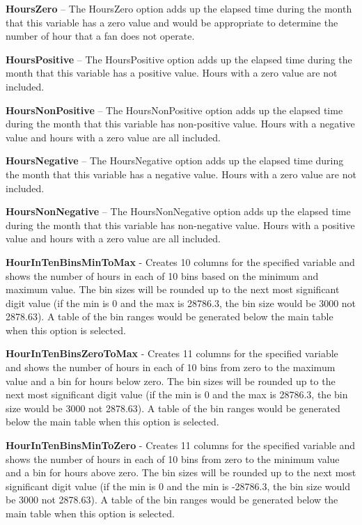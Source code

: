 \textbf{HoursZero} -- The HoursZero option adds up the elapsed time during the month that this variable has a zero value and would be appropriate to determine the number of hour that a fan does not operate.

\textbf{HoursPositive} -- The HoursPositive option adds up the elapsed time during the month that this variable has a positive value. Hours with a zero value are not included.

\textbf{HoursNonPositive} -- The HoursNonPositive option adds up the elapsed time during the month that this variable has non-positive value. Hours with a negative value and hours with a zero value are all included.

\textbf{HoursNegative} -- The HoursNegative option adds up the elapsed time during the month that this variable has a negative value. Hours with a zero value are not included.

\textbf{HoursNonNegative} -- The HoursNonNegative option adds up the elapsed time during the month that this variable has non-negative value. Hours with a positive value and hours with a zero value are all included.

\textbf{HourInTenBinsMinToMax} - Creates 10 columns for the specified variable and shows the number of hours in each of 10 bins based on the minimum and maximum value. The bin sizes will be rounded up to the next most significant digit value (if the min is 0 and the max is 28786.3, the bin size would be 3000 not 2878.63). A table of the bin ranges would be generated below the main table when this option is selected.

\textbf{HourInTenBinsZeroToMax} - Creates 11 columns for the specified variable and shows the number of hours in each of 10 bins from zero to the maximum value and a bin for hours below zero. The bin sizes will be rounded up to the next most significant digit value (if the min is 0 and the max is 28786.3, the bin size would be 3000 not 2878.63). A table of the bin ranges would be generated below the main table when this option is selected.

\textbf{HourInTenBinsMinToZero} - Creates 11 columns for the specified variable and shows the number of hours in each of 10 bins from zero to the minimum value and a bin for hours above zero. The bin sizes will be rounded up to the next most significant digit value (if the min is 0 and the min is -28786.3, the bin size would be 3000 not 2878.63). A table of the bin ranges would be generated below the main table when this option is selected.

